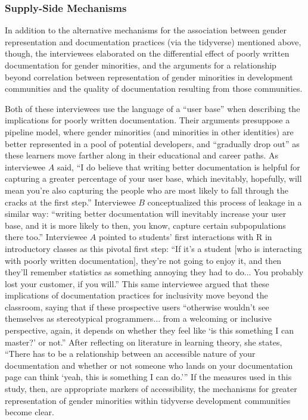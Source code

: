 \subsubsection{Supply-Side Mechanisms} \hspace{10pt} In addition to the alternative mechanisms for the association between gender representation and documentation practices (via the tidyverse) mentioned above, though, the interviewees elaborated on the differential effect of poorly written documentation for gender minorities, and the arguments for a relationship beyond correlation between representation of gender minorities in development communities and the quality of documentation resulting from those communities.

Both of these interviewees use the language of a ``user base'' when describing the implications for poorly written documentation. Their arguments presuppose a pipeline model, where gender minorities (and minorities in other identities) are better represented in a pool of potential developers, and ``gradually drop out'' as these learners move farther along in their educational and career paths. As interviewee $A$ said, ``I do believe that writing better documentation is helpful for capturing a greater percentage of your user base, which inevitably, hopefully, will mean you’re also capturing the people who are most likely to fall through the cracks at the first step.'' Interviewee $B$ conceptualized this process of leakage in a similar way: ``writing better documentation will inevitably increase your user base, and it is more likely to then, you know, capture certain subpopulations there too.'' Interviewee $A$ pointed to students' first interactions with R in introductory classes as this pivotal first step: ``If it’s a student [who is interacting with poorly written documentation], they’re not going to enjoy it, and then they’ll remember statistics as something annoying they had to do... You probably lost your customer, if you will.'' This same interviewee argued that these implications of documentation practices for inclusivity move beyond the classroom, saying that if these prospective users ``otherwise wouldn’t see themselves as stereotypical programmers... from a welcoming or inclusive perspective, again, it depends on whether they feel like `is this something I can master?' or not.'' After reflecting on literature in learning theory, she states, ``There has to be a relationship between an accessible nature of your documentation and whether or not someone who lands on your documentation page can think `yeah, this is something I can do.'\thinspace'' If the measures used in this study, then, are appropriate markers of accessibility, the mechanisms for greater representation of gender minorities within tidyverse development communities become clear.


